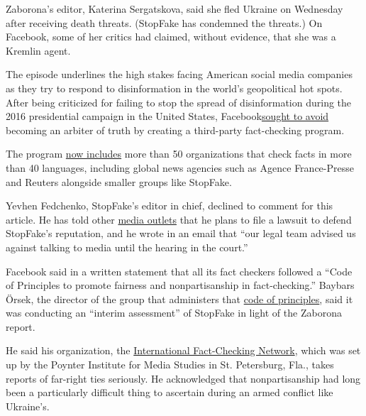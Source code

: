 Zaborona's editor, Katerina Sergatskova, said she fled Ukraine on
Wednesday after receiving death threats. (StopFake has condemned the
threats.) On Facebook, some of her critics had claimed, without
evidence, that she was a Kremlin agent.

The episode underlines the high stakes facing American social media
companies as they try to respond to disinformation in the world's
geopolitical hot spots. After being criticized for failing to stop the
spread of disinformation during the 2016 presidential campaign in the
United States,
Facebook\href{https://www.nytimes3xbfgragh.onion/2016/12/15/technology/facebook-fake-news.html?ribbon-ad-idx=4\&rref=business/media\&module=Ribbon\&version=context\&region=Header\&action=click\&contentCollection=Media\&pgtype=oak}{sought
to avoid} becoming an arbiter of truth by creating a third-party
fact-checking program.

The program
\href{https://www.facebookcorewwwi.onion/journalismproject/fact-checking-expansion-and-investment-2020}{now
includes} more than 50 organizations that check facts in more than 40
languages, including global news agencies such as Agence France-Presse
and Reuters alongside smaller groups like StopFake.

Yevhen Fedchenko, StopFake's editor in chief, declined to comment for
this article. He has told other
\href{https://www.dw.com/ru/\%D1\%81\%D0\%BA\%D0\%B0\%D0\%BD\%D0\%B4\%D0\%B0\%D0\%BB-\%D0\%B8\%D0\%B7-\%D0\%B7\%D0\%B0-\%D1\%81\%D1\%82\%D0\%B0\%D1\%82\%D1\%8C\%D0\%B8-\%D0\%BE-\%D1\%81\%D0\%B2\%D1\%8F\%D0\%B7\%D1\%8F\%D1\%85-\%D1\%81-\%D1\%83\%D0\%BB\%D1\%8C\%D1\%82\%D1\%80\%D0\%B0\%D0\%BF\%D1\%80\%D0\%B0\%D0\%B2\%D1\%8B\%D0\%BC\%D0\%B8-\%D0\%BE-\%D1\%87\%D0\%B5\%D0\%BC-\%D1\%81\%D0\%BF\%D0\%BE\%D1\%80\%D1\%8F\%D1\%82-\%D1\%81\%D0\%BC\%D0\%B8-\%D1\%83\%D0\%BA\%D1\%80\%D0\%B0\%D0\%B8\%D0\%BD\%D1\%8B/a-54223470}{media
outlets} that he plans to file a lawsuit to defend StopFake's
reputation, and he wrote in an email that ``our legal team advised us
against talking to media until the hearing in the court.''

Facebook said in a written statement that all its fact checkers followed
a ``Code of Principles to promote fairness and nonpartisanship in
fact-checking.'' Baybars Örsek, the director of the group that
administers that \href{https://ifcncodeofprinciples.poynter.org/}{code
of principles}, said it was conducting an ``interim assessment'' of
StopFake in light of the Zaborona report.

He said his organization, the
\href{https://www.poynter.org/ifcn/}{International Fact-Checking
Network}, which was set up by the Poynter Institute for Media Studies in
St. Petersburg, Fla., takes reports of far-right ties seriously. He
acknowledged that nonpartisanship had long been a particularly difficult
thing to ascertain during an armed conflict like Ukraine's.

